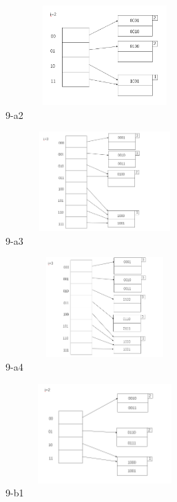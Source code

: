 \documentclass[10pt]{article}
\begin{document}
\begin{figure}[h]
        \centering
        \includegraphics[height = 1.5in, width = 3in]{figure/9a2.png}
        \caption{9-a2}
    \end{figure}
\bigskip



\begin{figure}[h]
        \centering
        \includegraphics[height = 1.5in, width = 3in]{figure/9a3.png}
        \caption{9-a3}
    \end{figure}
\bigskip

\begin{figure}[h]
        \centering
        \includegraphics[height = 1.5in, width = 3in]{figure/9a4.png}
        \caption{9-a4}
    \end{figure}
\bigskip

\begin{figure}[h]
        \centering
        \includegraphics[height = 1.5in, width = 3in]{figure/9b1.png}
        \caption{9-b1}
    \end{figure}
\bigskip
\end{document}
